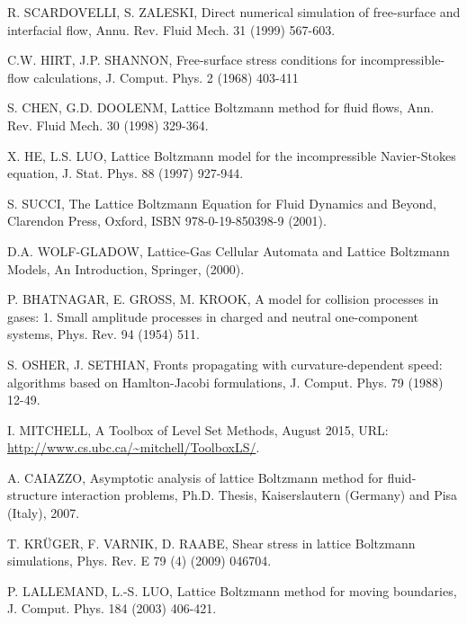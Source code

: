 \documentclass[final,leqno,onefignum,onetabnum]{siamltexmm}
\begin{document}
\begin{thebibliography}{1}
 {\sc R. SCARDOVELLI, S. ZALESKI}, Direct numerical simulation of free-surface and interfacial flow, Annu. Rev. Fluid Mech. 31 (1999) 567-603.

 {\sc C.W. HIRT, J.P. SHANNON}, Free-surface stress conditions for incompressible-flow calculations, J. Comput. Phys. 2 (1968) 403-411

 {\sc S. CHEN, G.D. DOOLENM}, Lattice Boltzmann method for fluid flows, Ann. Rev. Fluid Mech. 30 (1998) 329-364.

 {\sc X. HE, L.S. LUO}, Lattice Boltzmann model for the incompressible Navier-Stokes equation, J. Stat. Phys. 88 (1997) 927-944.

 {\sc S. SUCCI}, The Lattice Boltzmann Equation for Fluid Dynamics and Beyond, Clarendon Press, Oxford, ISBN 978-0-19-850398-9 (2001).

 {\sc D.A. WOLF-GLADOW}, Lattice-Gas Cellular Automata and Lattice Boltzmann Models, An Introduction, Springer, (2000).

 {\sc P. BHATNAGAR, E. GROSS, M. KROOK}, A model for collision processes in gases: 1. Small amplitude processes in charged and neutral one-component systems, Phys. Rev. 94 (1954) 511.

 {\sc S. OSHER, J. SETHIAN}, Fronts propagating with curvature-dependent speed: algorithms based on Hamlton-Jacobi formulations, J. Comput. Phys. 79 (1988) 12-49.

I. MITCHELL, A Toolbox of Level Set Methods, August 2015, URL: \url{http://www.cs.ubc.ca/~mitchell/ToolboxLS/}.

 {\sc A. CAIAZZO}, Asymptotic analysis of lattice Boltzmann method for fluid-structure interaction problems, Ph.D. Thesis, Kaiserslautern (Germany) and Pisa (Italy), 2007.

 {\sc T. KR\"UGER, F. VARNIK, D. RAABE}, Shear stress in lattice Boltzmann simulations, Phys. Rev. E 79 (4) (2009) 046704.

 {\sc P. LALLEMAND, L.-S. LUO}, Lattice Boltzmann method for moving boundaries, J. Comput. Phys. 184 (2003) 406-421.

\end{thebibliography}
\end{document}

